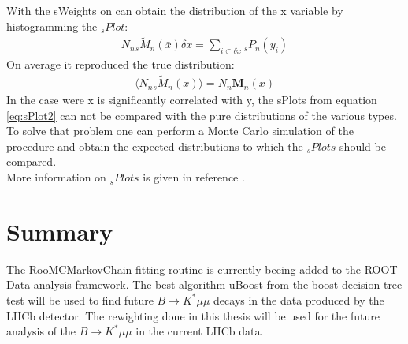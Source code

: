 \documentclass[english]{uzhpub}
\begin{document}
 With the sWeights on can obtain the distribution of the x variable by histogramming the $_s Plot$:
 \begin{align}
  N_n { }_{s} \tilde{M}_n (\bar{x}) \delta x = \sum_{i \subset \delta x} { }_{s} P_n (y_i) \label{eq:sPlot2}
 \end{align}
 On average it reproduced the true distribution:
 \begin{align}
  \langle N_n { }_s \tilde{M}_n (x) \rangle = N_n \textbf{M}_n (x)
 \end{align}
In the case were x is significantly correlated with y, the sPlots from equation \ref{eq:sPlot2} can not be compared with the pure distributions of the various types. To solve that problem one can perform a Monte Carlo simulation of the procedure and obtain the expected distributions to which the $_s Plots$ should be compared. \\
More information on $_s Plots$ is given in reference \cite{bib:sPlot}.

\section{Summary}
The RooMCMarkovChain fitting routine is currently beeing added \cite{bib:pull} to the ROOT Data analysis framework. The best algorithm uBoost from the boost decision tree test will be used to find future $B \rightarrow K^* \mu \mu$ decays in the data produced by the LHCb detector. The rewighting done in this thesis will be used for the future analysis of the $B \rightarrow K^* \mu \mu$ in the current LHCb data.
\end{document}
